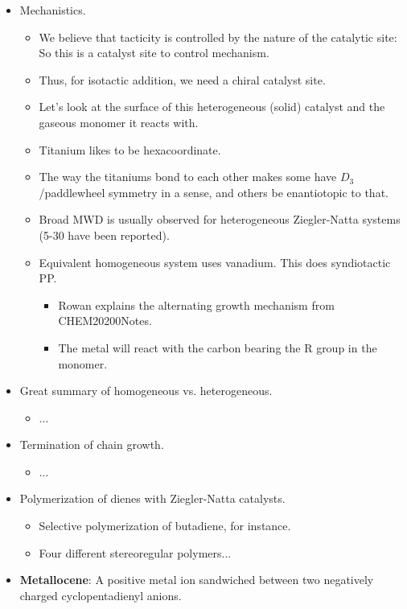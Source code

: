 \documentclass[../notes.tex]{subfiles}
\begin{document}
\begin{itemize}
\begin{itemize}
    \end{itemize}
    \item Mechanistics.
    \begin{itemize}
        \item We believe that tacticity is controlled by the nature of the catalytic site: So this is a catalyst site to control mechanism.
        \item Thus, for isotactic addition, we need a chiral catalyst site.
        \item Let's look at the surface of this heterogeneous (solid) catalyst and the gaseous monomer it reacts with.
        \item Titanium likes to be hexacoordinate.
        \item The way the titaniums bond to each other makes some have $D_3$/paddlewheel symmetry in a sense, and others be enantiotopic to that.
        \item Broad MWD is usually observed for heterogeneous Ziegler-Natta systems (5-30 have been reported).
        \item Equivalent homogeneous system uses vanadium. This does syndiotactic PP.
        \begin{itemize}
            \item Rowan explains the alternating growth mechanism from CHEM20200Notes.
            \item The metal will react with the carbon bearing the R group in the monomer.
        \end{itemize}
    \end{itemize}
    \item Great summary of homogeneous vs. heterogeneous.
    \begin{itemize}
        \item ...
    \end{itemize}
    \item Termination of chain growth.
    \begin{itemize}
        \item ...
    \end{itemize}
    \item Polymerization of dienes with Ziegler-Natta catalysts.
    \begin{itemize}
        \item Selective polymerization of butadiene, for instance.
        \item Four different stereoregular polymers...
    \end{itemize}
    \item \textbf{Metallocene}: A positive metal ion sandwiched between two negatively charged cyclopentadienyl anions.

\end{itemize}
\end{document}
